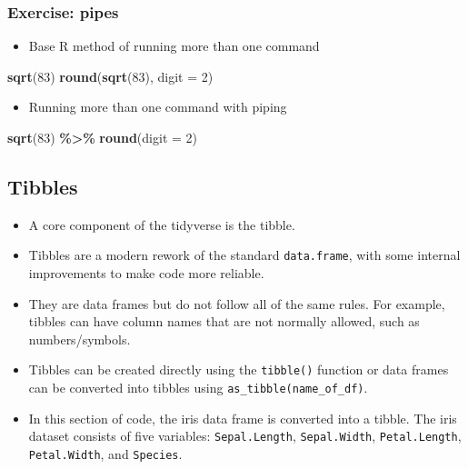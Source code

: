 \documentclass[
]{book}
\newenvironment{Shaded}{\begin{snugshade}}{\end{snugshade}}
\newcommand{\AttributeTok}[1]{\textcolor[rgb]{0.13,0.29,0.53}{#1}}
\newcommand{\DecValTok}[1]{\textcolor[rgb]{0.00,0.00,0.81}{#1}}
\newcommand{\FunctionTok}[1]{\textcolor[rgb]{0.13,0.29,0.53}{\textbf{#1}}}
\newcommand{\NormalTok}[1]{#1}
\newcommand{\SpecialCharTok}[1]{\textcolor[rgb]{0.81,0.36,0.00}{\textbf{#1}}}
\providecommand{\tightlist}{%
  \setlength{\itemsep}{0pt}\setlength{\parskip}{0pt}}
\begin{document}
\subsubsection{Exercise: pipes}\label{exercise-pipes}

\begin{itemize}
\tightlist
\item
  Base R method of running more than one command
\end{itemize}

\begin{Shaded}
\begin{Highlighting}[]
\FunctionTok{sqrt}\NormalTok{(}\DecValTok{83}\NormalTok{)}
\FunctionTok{round}\NormalTok{(}\FunctionTok{sqrt}\NormalTok{(}\DecValTok{83}\NormalTok{), }\AttributeTok{digit =} \DecValTok{2}\NormalTok{)}
\end{Highlighting}
\end{Shaded}

\begin{itemize}
\tightlist
\item
  Running more than one command with piping
\end{itemize}

\begin{Shaded}
\begin{Highlighting}[]
\FunctionTok{sqrt}\NormalTok{(}\DecValTok{83}\NormalTok{) }\SpecialCharTok{\%\textgreater{}\%} \FunctionTok{round}\NormalTok{(}\AttributeTok{digit =} \DecValTok{2}\NormalTok{)}
\end{Highlighting}
\end{Shaded}

\subsection{Tibbles}\label{tibbles}

\begin{itemize}
\tightlist
\item
  A core component of the tidyverse is the tibble.
\item
  Tibbles are a modern rework of the standard \texttt{data.frame}, with some internal improvements to make code more reliable.
\item
  They are data frames but do not follow all of the same rules. For example, tibbles can have column names that are not normally allowed, such as numbers/symbols.
\item
  Tibbles can be created directly using the \texttt{tibble()} function or data frames can be converted into tibbles using \texttt{as\_tibble(name\_of\_df)}.
\item
  In this section of code, the iris data frame is converted into a tibble. The iris dataset consists of five variables: \texttt{Sepal.Length}, \texttt{Sepal.Width}, \texttt{Petal.Length}, \texttt{Petal.Width}, and \texttt{Species}.
\end{itemize}
\end{document}
